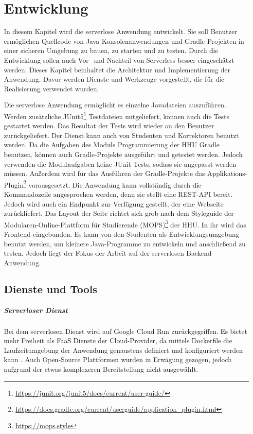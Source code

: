 \chapter{Entwicklung}
In diesem Kapitel wird die serverlose Anwendung entwickelt.
Sie soll Benutzer ermöglichen Quellcode von Java Konsolenanwendungen und Gradle-Projekten
in einer sicheren Umgebung zu bauen, zu starten und zu testen. Durch die Entwicklung sollen auch Vor- und Nachteil
von Serverless besser eingeschätzt werden.
Dieses Kapitel beinhaltet die Architektur und Implementierung
der Anwendung. Davor werden Dienste und Werkzeuge vorgestellt,
die für die Realisierung verwendet wurden.

Die serverlose Anwendung ermöglicht es einzelne Javadateien auszuführen.
Werden zusätzliche JUnit5\footnote{\url{https://junit.org/junit5/docs/current/user-guide/}}
Testdateien mitgeliefert, können auch die Tests gestartet werden.
Das Resultat der Tests wird wieder an den Benutzer zurückgeliefert.
Der Dienst kann auch von Studenten und Korrektoren benutzt werden.
Da die Aufgaben des Moduls Programmierung der HHU Gradle benutzen,
können auch Gradle-Projekte ausgeführt und getestet werden.
Jedoch verwenden die Modulaufgaben keine JUnit Tests, sodass sie angepasst werden müssen.
Außerdem wird für das Ausführen der Gradle-Projekte
das Applikations-Plugin\footnote{\url{https://docs.gradle.org/current/userguide/application_plugin.html}}
vorausgesetzt. Die Anwendung kann vollständig durch die Kommandozeile angesprochen werden, denn
sie stellt eine REST-API bereit.
Jedoch wird auch ein Endpunkt zur Verfügung gestellt, der eine Webseite zurückliefert.
Das Layout der Seite richtet sich grob nach dem Styleguide der
Modularen-Online-Plattform für Studierende (MOPS)\footnote{\url{https://mops.style}}
der HHU. In ihr wird das Frontend eingebunden.
Es kann von den Studenten als Entwicklungsumgebung benutzt werden, um
kleinere Java-Programme zu entwickeln und anschließend zu testen.
Jedoch liegt der Fokus der Arbeit auf der serverlosen Backend-Anwendung.


\section{Dienste und Tools}
\paragraph{Serverloser Dienst} Bei dem serverlosen Dienst wird auf Google Cloud Run zurückgegriffen.
Es bietet mehr Freiheit als FaaS Dienste der Cloud-Provider, da mittels Dockerfile die Laufzeitumgebung
der Anwendung genaustens definiert und konfiguriert werden kann \cite{CloudRun}. Auch Open-Source
Plattformen wurden in Erwägung gezogen, jedoch aufgrund der etwas komplexeren Bereitstellung nicht ausgewählt.

